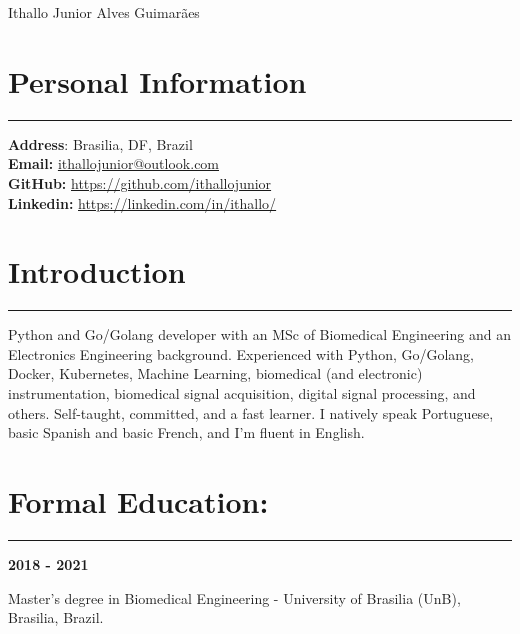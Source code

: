 \documentclass[11pt]{article}
\begin{document}
\begin{center}
\huge{Ithallo Junior Alves Guimarães}
\end{center}

\section{Personal Information}
\hrule \vspace{0.1cm}

\begin{addmargin}{0.5cm}

\textbf{Address}: Brasilia, DF, Brazil \\
\textbf{Email:}   \href{maito:ithallojunior@outlook.com}{ithallojunior@outlook.com} \\
\textbf{GitHub:} \url{https://github.com/ithallojunior} \\
\textbf{Linkedin:} \url{https://linkedin.com/in/ithallo/}

\end{addmargin}

\section{Introduction}
\hrule \vspace{0.1cm}

\begin{addmargin}{0.5cm}
Python  and Go/Golang developer with an MSc of Biomedical Engineering and an Electronics Engineering background.
Experienced with Python, Go/Golang, Docker, Kubernetes, Machine Learning, 
biomedical (and electronic) instrumentation, biomedical signal 
acquisition, digital signal processing, and others. Self-taught, committed, and a fast learner. I natively speak Portuguese,
basic Spanish and basic French, and I'm fluent in English.

\end{addmargin}

\section{Formal Education:}
\hrule \vspace{0.1cm}

\textbf{2018 - 2021}
\begin{addmargin}{0.5cm}
Master's degree in Biomedical Engineering - University of Brasilia (UnB), Brasilia, Brazil. \\
\end{addmargin}
\end{document}

